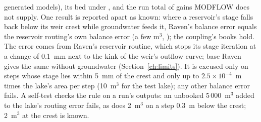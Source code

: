 generated models), its bed under , and the run total of gains MODFLOW does not supply. One result is reported
apart as known: where a reservoir's stage falls back below its weir crest while groundwater feeds it, Raven's balance error
equals the reservoir routing's own balance error (a few m$^3$, ); the coupling's books hold.
The error comes from Raven's reservoir routine, which stops its stage iteration at a change of 0.1~mm next to the kink of the
weir's outflow curve; base Raven gives the same without groundwater (Section~\ref{ch:limits}). It is excused only on steps
whose stage lies within 5~mm of the crest and only up to $2.5\times10^{-4}$~m times the lake's area per step (10~m$^3$ for
the test lake); any other balance error fails. A self-test checks the rule on a run's outputs: an unbooked 5\,000~m$^3$
added to the lake's routing error fails, as does 2~m$^3$ on a step 0.3~m below the crest; 2~m$^3$ at the crest is known.

